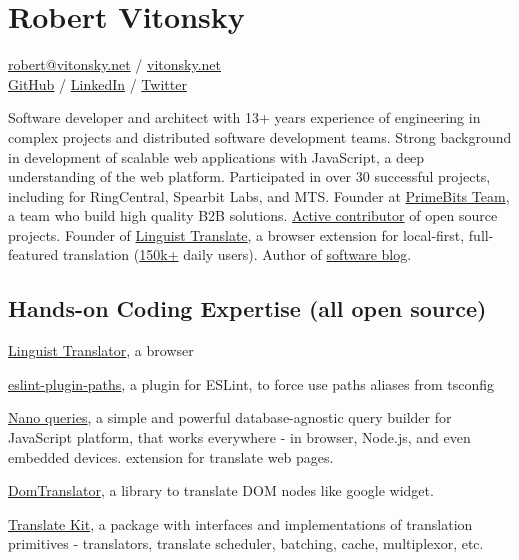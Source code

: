 \documentclass{vitonsky}
\begin{document}
\vitonskyPrintPhoto{}

\section*{\Large{Robert Vitonsky}}

\href{mailto:robert@vitonsky.net}{robert@vitonsky.net} / \href{https://vitonsky.net}{vitonsky.net}\\%
\href{https://github.com/vitonsky}{GitHub} /
\href{https://www.linkedin.com/in/vitonsky}{LinkedIn} /
\href{https://twitter.com/rvitonsky}{Twitter}

\vspace*{12pt}

Software developer and architect with 13+ years experience of engineering in complex projects and distributed software development teams. Strong background in development of scalable web applications with JavaScript, a deep understanding of the web platform. Participated in over 30 successful projects, including for RingCentral, Spearbit Labs, and MTS. Founder at \href{primebits.org}{PrimeBits Team}, a team who build high quality B2B solutions. \href{https://github.com/vitonsky}{Active contributor} of open source projects. Founder of \href{https://linguister.io}{Linguist Translate}, a browser extension for local-first, full-featured translation (\href{https://chrome.google.com/webstore/detail/gbefmodhlophhakmoecijeppjblibmie}{150k+} daily users). Author of \href{https://vitonsky.net/}{software blog}.

\subsection*{Hands-on Coding Expertise (all open source)}

\href{https://github.com/translate-tools/linguist}{Linguist Translator}, a browser

\href{https://github.com/vitonsky/eslint-plugin-paths}{eslint-plugin-paths}, a plugin for ESLint, to force use paths aliases from tsconfig

\href{https://github.com/vitonsky/nano-queries}{Nano queries}, a simple and powerful database-agnostic query builder for JavaScript platform, that works everywhere - in browser, Node.js, and even embedded devices.
extension for translate web pages.

\href{https://github.com/translate-tools/domtranslator}{DomTranslator}, a library to translate DOM nodes like google widget.

\href{https://github.com/translate-tools/core}{Translate Kit}, a package with interfaces and implementations of translation primitives - translators, translate scheduler, batching, cache, multiplexor, etc.
\end{document}
